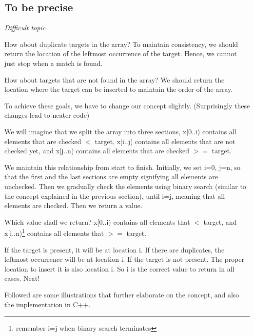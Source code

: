 \pagebreak

\subsection*{To be precise}

\textit{Difficult topic}
\vspace{6mm}

How about duplicate targets in the array? To maintain consistency, we should return the location of the leftmost occurrence of the target. Hence, we cannot just stop when a match is found.

How about targets that are not found in the array? We should return the location where the target can be inserted to maintain the order of the array. 

To achieve these goals, we have to change our concept slightly. (Surprisingly these changes lead to neater code)
\vspace{6mm}

We will imagine that we split the array into three sections, x[0..i) contains all elements that are checked $<$ target, x[i..j) contains all elements that are not checked yet, and x[j..n) contains all elements that are checked $>=$ target. 

We maintain this relationship from start to finish. Initially, we set i=0, j=n, so that the first and the last sections are empty signifying all elements are unchecked. Then we gradually check the elements using binary search (similar to the concept explained in the previous section), until i=j, meaning that all elements are checked. Then we return a value.
\vspace{6mm}

Which value shall we return? x[0..i) contains all elements that $<$ target, and x[i..n)\footnote{remember i=j when binary search terminates} contains all elements that $>=$ target. 

If the target is present, it will be at location i. If there are duplicates, the leftmost occurrence will be at location i. If the target is not present. The proper location to insert it is also location i. So i is the correct value to return in all cases. Neat!
\vspace{6mm}

Followed are some illustrations that further elaborate on the concept, and also the implementation in C++.
\vspace{6mm}

